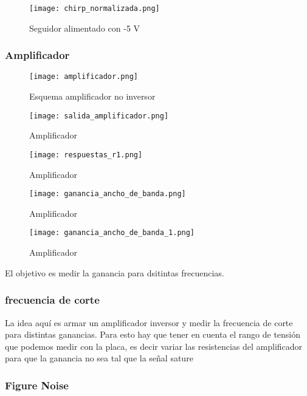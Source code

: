 \documentclass[a4paper, 11pt]{article}
\begin{document}
\begin{figure} [H]
\centering
\texttt{[image: chirp\_normalizada.png]}
\caption{ Seguidor alimentado con -5 V\label{fig:chirp_normalizada}}
\end{figure} 


\subsubsection*{Amplificador}

\begin{figure} [H]
\centering
\texttt{[image: amplificador.png]}
\caption{ Esquema amplificador no inversor\label{fig:amplificador}}
\end{figure} 


\begin{figure} [H]
\centering
\texttt{[image: salida\_amplificador.png]}
\caption{ Amplificador\label{fig:salida_amplificador}}
\end{figure} 

\begin{figure} [H]
\centering
\texttt{[image: respuestas\_r1.png]}
\caption{ Amplificador\label{fig:respuestas_r1}}
\end{figure} 

\begin{figure} [H]
\centering
\texttt{[image: ganancia\_ancho\_de\_banda.png]}
\caption{ Amplificador\label{fig:ganancia_ancho_de_banda}}
\end{figure} 

\begin{figure} [H]
\centering
\texttt{[image: ganancia\_ancho\_de\_banda\_1.png]}
\caption{ Amplificador\label{fig:ganancia_ancho_de_banda_1}}
\end{figure} 


El objetivo es medir la ganancia para dsitintas frecuencias. 
\subsubsection*{frecuencia de corte}
La idea aquí es armar un amplificador inversor y medir la frecuencia de corte para distintas ganancias. Para esto hay que tener en cuenta el rango de tensión que podemos medir con la placa, es decir variar las resistencias del amplificador para que la ganancia no sea tal que la señal sature

\subsubsection*{Figure Noise}
\end{document}
